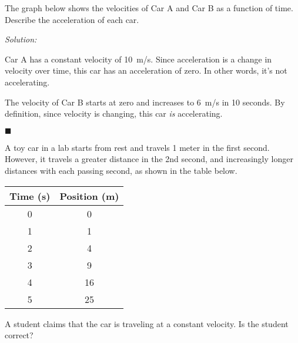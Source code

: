 \documentclass[dvipsnames]{article}
\begin{document}
\begin{example}
The graph below shows the velocities of Car A and Car B as a function of time. Describe the acceleration of each car.

\begin{center}
\end{center}
\end{example}

\textit{Solution:}

Car A has a constant velocity of \SI{10}{m/s}. Since acceleration is a change in velocity over time, this car has an acceleration of zero. In other words, it's not accelerating.

The velocity of Car B starts at zero and increases to \SI{6}{m/s} in 10 seconds. By definition, since velocity is changing, this car \textit{is} accelerating.

\hfill $\blacksquare$

\begin{example}
A toy car in a lab starts from rest and travels 1 meter in the first second. However, it travels a greater distance in the 2nd second, and increasingly longer distances with each passing second, as shown in the table below.

\begin{center}
    \begin{tabular}{|c|c|}
        \hline
         \textbf{Time} (s) & \textbf{Position} (m) \\ \hline
         0 & 0 \\ \hline
         1 & 1 \\ \hline
         2 & 4 \\ \hline
         3 & 9 \\ \hline
         4 & 16 \\ \hline
         5 & 25 \\ \hline
    \end{tabular}
\end{center}

A student claims that the car is traveling at a constant velocity. Is the student correct?
\end{example}
\end{document}
